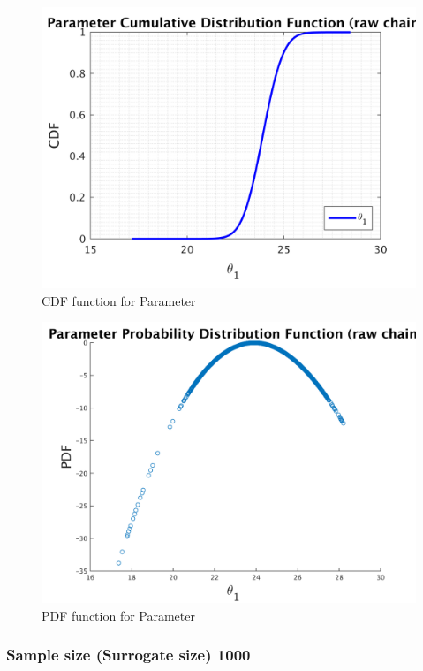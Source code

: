 \begin{figure}[H]
  
  \centering
   \includegraphics[scale=0.75]{100_results/outputData_500/simple_ip_cdf_raw}
   \caption{CDF function for Parameter }
\end{figure}



\begin{figure}[H]
  
  \centering
   \includegraphics[scale=0.75]{100_results/outputData_500/ip_logLike_unified}
   \caption{PDF function for Parameter }
\end{figure}


\subsubsection{Sample size (Surrogate size) 1000 }

